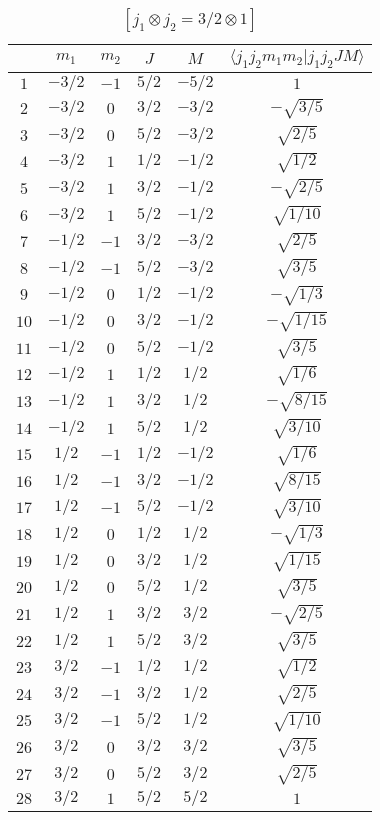 \begin{table}
\tiny
\caption{$[j_1 \otimes j_2 = 3/2 \otimes 1]$}
\begin{center}
\begin{tabular}{|c|c|c|c|c|c|}
\hline 
   & $m_1$ & $m_2$ & $J$ & $M$ & $\langle j_1 j_2 m_1 m_2 | j_1 j_2 J M \rangle$ \\ 
\hline 
$1$ & $-3/2$ & $-1$ & $5/2$ & $-5/2$ & $1$ \\ 
$2$ & $-3/2$ & $0$ & $3/2$ & $-3/2$ & $-\sqrt{3/5}$ \\ 
$3$ & $-3/2$ & $0$ & $5/2$ & $-3/2$ & $\sqrt{2/5}$ \\ 
$4$ & $-3/2$ & $1$ & $1/2$ & $-1/2$ & $\sqrt{1/2}$ \\ 
$5$ & $-3/2$ & $1$ & $3/2$ & $-1/2$ & $-\sqrt{2/5}$ \\ 
$6$ & $-3/2$ & $1$ & $5/2$ & $-1/2$ & $\sqrt{1/10}$ \\ 
$7$ & $-1/2$ & $-1$ & $3/2$ & $-3/2$ & $\sqrt{2/5}$ \\ 
$8$ & $-1/2$ & $-1$ & $5/2$ & $-3/2$ & $\sqrt{3/5}$ \\ 
$9$ & $-1/2$ & $0$ & $1/2$ & $-1/2$ & $-\sqrt{1/3}$ \\ 
$10$ & $-1/2$ & $0$ & $3/2$ & $-1/2$ & $-\sqrt{1/15}$ \\ 
$11$ & $-1/2$ & $0$ & $5/2$ & $-1/2$ & $\sqrt{3/5}$ \\ 
$12$ & $-1/2$ & $1$ & $1/2$ & $1/2$ & $\sqrt{1/6}$ \\ 
$13$ & $-1/2$ & $1$ & $3/2$ & $1/2$ & $-\sqrt{8/15}$ \\ 
$14$ & $-1/2$ & $1$ & $5/2$ & $1/2$ & $\sqrt{3/10}$ \\ 
$15$ & $1/2$ & $-1$ & $1/2$ & $-1/2$ & $\sqrt{1/6}$ \\ 
$16$ & $1/2$ & $-1$ & $3/2$ & $-1/2$ & $\sqrt{8/15}$ \\ 
$17$ & $1/2$ & $-1$ & $5/2$ & $-1/2$ & $\sqrt{3/10}$ \\ 
$18$ & $1/2$ & $0$ & $1/2$ & $1/2$ & $-\sqrt{1/3}$ \\ 
$19$ & $1/2$ & $0$ & $3/2$ & $1/2$ & $\sqrt{1/15}$ \\ 
$20$ & $1/2$ & $0$ & $5/2$ & $1/2$ & $\sqrt{3/5}$ \\ 
$21$ & $1/2$ & $1$ & $3/2$ & $3/2$ & $-\sqrt{2/5}$ \\ 
$22$ & $1/2$ & $1$ & $5/2$ & $3/2$ & $\sqrt{3/5}$ \\ 
$23$ & $3/2$ & $-1$ & $1/2$ & $1/2$ & $\sqrt{1/2}$ \\ 
$24$ & $3/2$ & $-1$ & $3/2$ & $1/2$ & $\sqrt{2/5}$ \\ 
$25$ & $3/2$ & $-1$ & $5/2$ & $1/2$ & $\sqrt{1/10}$ \\ 
$26$ & $3/2$ & $0$ & $3/2$ & $3/2$ & $\sqrt{3/5}$ \\ 
$27$ & $3/2$ & $0$ & $5/2$ & $3/2$ & $\sqrt{2/5}$ \\ 
$28$ & $3/2$ & $1$ & $5/2$ & $5/2$ & $1$ \\ 
\hline 
\end{tabular}
\end{center}
\end{table}

